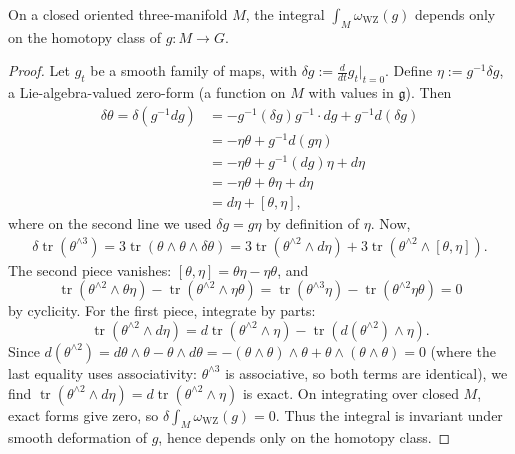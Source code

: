 \documentclass[11pt]{article}
\newcommand{\tr}{\operatorname{tr}}
\theoremstyle{definition}
\numberwithin{theorem}{section}
\numberwithin{equation}{section}
\begin{document}
\begin{corollary}\label{cor:WZ-homotopy}
On a closed oriented three-manifold $M$, the integral $\int_M \omega_{\text{WZ}}(g)$ depends only on the homotopy class of $g:M\to G$.
\end{corollary}

\begin{proof}
Let $g_t$ be a smooth family of maps, with $\delta g := \frac{d}{dt}g_t|_{t=0}$. Define $\eta := g^{-1}\delta g$, a Lie-algebra-valued zero-form (a function on $M$ with values in $\mathfrak{g}$). Then
\begin{align*}
\delta \theta = \delta(g^{-1}dg) &= -g^{-1}(\delta g)g^{-1}\cdot dg + g^{-1}d(\delta g) \\
&= -\eta\theta + g^{-1}d(g\eta) \\
&= -\eta\theta + g^{-1}(dg)\eta + d\eta \\
&= -\eta\theta + \theta\eta + d\eta \\
&= d\eta + [\theta,\eta],
\end{align*}
where on the second line we used $\delta g = g\eta$ by definition of $\eta$. Now,
\begin{align*}
\delta \tr(\theta^{\wedge 3}) = 3\tr(\theta\wedge\theta\wedge\delta\theta) = 3\tr\left(\theta^{\wedge 2}\wedge d\eta\right) + 3\tr\left(\theta^{\wedge 2}\wedge[\theta,\eta]\right).
\end{align*}
The second piece vanishes: $[\theta,\eta] = \theta\eta - \eta\theta$, and
\begin{equation*}
\tr(\theta^{\wedge 2}\wedge\theta\eta) - \tr(\theta^{\wedge 2}\wedge\eta\theta) = \tr(\theta^{\wedge 3}\eta) - \tr(\theta^{\wedge 2}\eta\theta) = 0
\end{equation*}
by cyclicity. For the first piece, integrate by parts:
\begin{equation*}
\tr(\theta^{\wedge 2}\wedge d\eta) = d\tr(\theta^{\wedge 2}\wedge\eta) - \tr(d(\theta^{\wedge 2})\wedge\eta).
\end{equation*}
Since $d(\theta^{\wedge 2}) = d\theta\wedge\theta - \theta\wedge d\theta = -(\theta\wedge\theta)\wedge\theta + \theta\wedge(\theta\wedge\theta) = 0$ (where the last equality uses associativity: $\theta^{\wedge 3}$ is associative, so both terms are identical), we find $\tr(\theta^{\wedge 2}\wedge d\eta) = d\tr(\theta^{\wedge 2}\wedge\eta)$ is exact. On integrating over closed $M$, exact forms give zero, so $\delta\int_M \omega_{\text{WZ}}(g) = 0$. Thus the integral is invariant under smooth deformation of $g$, hence depends only on the homotopy class.
\end{proof}
\end{document}
